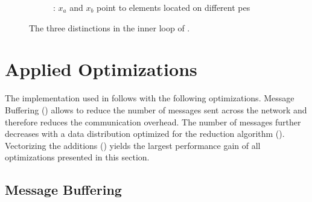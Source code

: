 \begin{figure}
\begin{subfigure}{0.32\textwidth}
\caption{: $x_a$ and $x_b$ point to elements located on different \glspl{pe}}
\label{fig:algoRankIntersecting}
\end{subfigure}

\caption{The three distinctions in the inner loop of .}
\label{fig:algorithmCaseDistinction}
\end{figure}



\section{Applied Optimizations}
\label{sec:AppliedOptimizations}

The implementation used in  follows  with the following optimizations.
Message Buffering () allows to reduce the number of messages sent across the network and therefore reduces the communication overhead.
The number of messages further decreases with a data distribution optimized for the reduction algorithm ().
Vectorizing the additions () yields the largest performance gain of all optimizations presented in this section.

\subsection{Message Buffering}
\label{sec:MessageBuffering}

